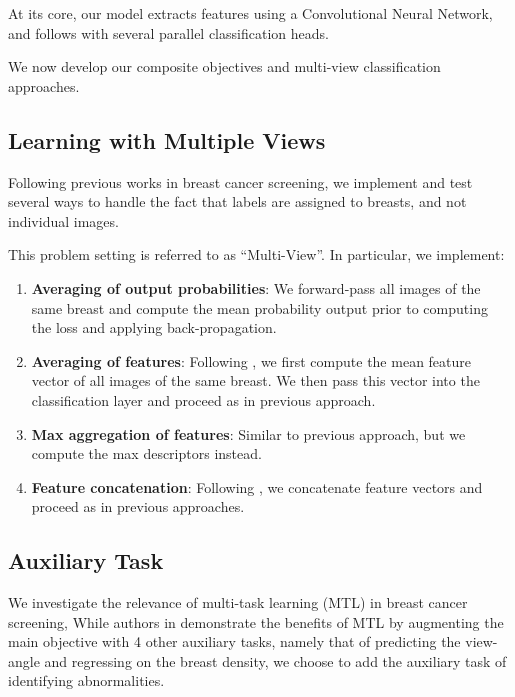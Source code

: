 \documentclass[11pt]{article}
\begin{document}
At its core, our model extracts features using a Convolutional Neural Network,
and follows with several parallel classification heads.

We now develop our composite objectives and multi-view classification approaches.

\subsection{\label{multiview}Learning with Multiple Views}
\label{sec:org104d58e}

Following previous works in breast cancer screening,
we implement and test several ways to handle the fact that
labels are assigned to breasts, and not individual images.

This problem setting is referred to as ``Multi-View''.
In particular, we implement:

\begin{enumerate}
\item \textbf{Averaging of output probabilities}:  We forward-pass all images of the same breast
and compute the mean probability output prior to computing the loss and applying
back-propagation.
\item \textbf{Averaging of features}: Following \autocite{geras17} \autocite{seeland21}, we first compute the mean feature vector of all images of the same
breast. We then pass this vector into the classification layer and proceed as in
previous approach.
\item \textbf{Max aggregation of features}: Similar to previous approach, but we compute the max descriptors instead.
\item \textbf{Feature concatenation}: Following \autocite{wu19} \autocite{chen22}, we concatenate feature
vectors and proceed as in previous approaches.
\end{enumerate}

\subsection{Auxiliary Task}
\label{sec:org451e51c}

We investigate the relevance of multi-task learning (MTL) in breast cancer screening,
While authors in \autocite{tardy22} demonstrate the benefits of MTL
by augmenting the main objective with
4 other auxiliary tasks, namely that of predicting the view-angle and
regressing on the breast density,
we choose to add the auxiliary task of identifying abnormalities.
\end{document}
